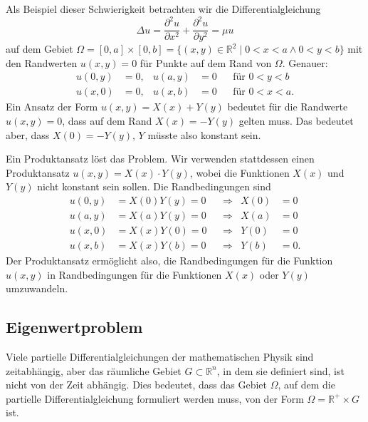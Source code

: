 Als Beispiel dieser Schwierigkeit betrachten wir die Differentialgleichung
\[
\Delta u
=
\frac{\partial^2 u}{\partial x^2}
+
\frac{\partial^2 u}{\partial y^2}
=
\mu u
\]
auf dem Gebiet
$\Omega = [0,a]\times [0,b] = \{(x,y)\in\mathbb{R}^2\mid 0<x<a\wedge 0<y<b\}$
mit den Randwerten $u(x,y)=0$ für Punkte auf dem Rand von $\Omega$.
Genauer:
\[
\begin{aligned}
u(0,y) &= 0,& u(a,y) &= 0&&\text{für $0<y<b$} \\
u(x,0) &= 0,& u(x,b) &= 0&&\text{für $0<x<a$}.
\end{aligned}
\]
Ein Ansatz der Form $u(x,y)=X(x) + Y(y)$ bedeutet für die
Randwerte $u(x,y)=0$, dass auf dem Rand $X(x)=-Y(y)$ gelten muss.
Das bedeutet aber, dass $X(0) = -Y(y)$, $Y$ müsste also konstant
sein.

Ein Produktansatz löst das Problem.
Wir verwenden stattdessen einen Produktansatz
$u(x,y) = X(x)\cdot Y(y)$, wobei die Funktionen $X(x)$ und $Y(y)$
nicht konstant sein sollen.
Die Randbedingungen sind
\[
\begin{aligned}
u(0,y) &= X(0) Y(y) = 0&&\Rightarrow& X(0)&=0\\
u(a,y) &= X(a) Y(y) = 0&&\Rightarrow& X(a)&=0\\
u(x,0) &= X(x) Y(0) = 0&&\Rightarrow& Y(0)&=0\\
u(x,b) &= X(x) Y(b) = 0&&\Rightarrow& Y(b)&=0.
\end{aligned}
\]
Der Produktansatz ermöglicht also, die Randbedingungen für die Funktion
$u(x,y)$ in Randbedingungen für die Funktionen $X(x)$ oder $Y(y)$
umzuwandeln.

%
%
\subsection{Eigenwertproblem
\label{buch:pde:subsection:eigenwertproblem}}
Viele partielle Differentialgleichungen der mathematischen Physik
sind zeitabhängig, aber das räumliche Gebiet $G\subset\mathbb{R}^n$,
in dem sie definiert sind, ist nicht von der Zeit abhängig.
Dies bedeutet, dass das Gebiet $\Omega$, auf dem die partielle
Differentialgleichung formuliert werden muss, von der Form
\(
\Omega
=
\mathbb{R}^+
\times 
G
\)
ist.

%
%
